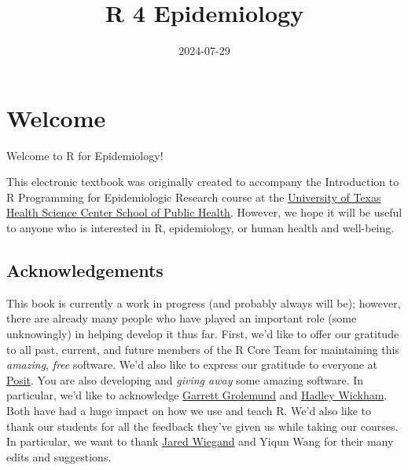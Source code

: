 \documentclass[
  letterpaper,
  DIV=11,
  numbers=noendperiod]{scrreprt}
\title{R 4 Epidemiology}
\author{}
\date{2024-07-29}
\renewcommand*\contentsname{Table of contents}
\newcommand\contentsname{Table of contents}
\begin{document}
\maketitle

\renewcommand*\contentsname{Table of contents}
{
\hypersetup{linkcolor=}
\setcounter{tocdepth}{2}
\tableofcontents
}

\chapter*{Welcome}\label{welcome}


Welcome to R for Epidemiology!

This electronic textbook was originally created to accompany the
Introduction to R Programming for Epidemiologic Research course at the
\href{https://sph.uth.edu/}{University of Texas Health Science Center
School of Public Health}. However, we hope it will be useful to anyone
who is interested in R, epidemiology, or human health and well-being.

\section*{Acknowledgements}\label{acknowledgements}


This book is currently a work in progress (and probably always will be);
however, there are already many people who have played an important role
(some unknowingly) in helping develop it thus far. First, we'd like to
offer our gratitude to all past, current, and future members of the R
Core Team for maintaining this \emph{amazing}, \emph{free} software.
We'd also like to express our gratitude to everyone at
\href{https://posit.co/}{Posit}. You are also developing and
\emph{giving away} some amazing software. In particular, we'd like to
acknowledge
\href{https://www.linkedin.com/in/garrett-grolemund-49328411/}{Garrett
Grolemund} and \href{https://hadley.nz/}{Hadley Wickham}. Both have had
a huge impact on how we use and teach R. We'd also like to thank our
students for all the feedback they've given us while taking our courses.
In particular, we want to thank
\href{https://www.linkedin.com/in/jared-wiegand/}{Jared Wiegand} and
Yiqun Wang for their many edits and suggestions.
\end{document}

